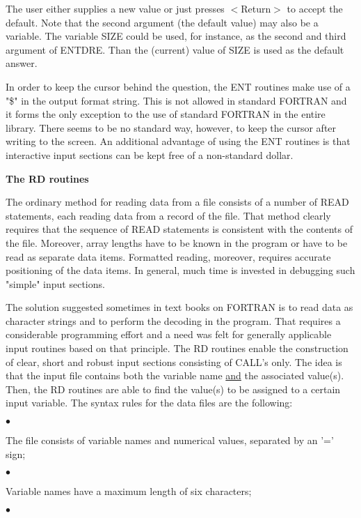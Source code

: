 \documentclass[11pt]{article}
\begin{document}
The user either supplies a new value or just presses $<$Return$>$ to accept the default.
Note that the second argument (the default value) may also be a variable. The variable
SIZE could be used, for instance, as the second and  third argument of ENTDRE. Than
the (current) value of SIZE is used as the default answer.

In order to keep the cursor behind the question, the ENT routines make use of a "\$" in
the output format string. This is not allowed in standard FORTRAN and it forms the only
exception to the use of standard FORTRAN in the entire library. There seems to be no
standard way, however, to keep the cursor after writing to the screen. An additional
advan\-tage of using the ENT routines is that interactive input sections can be kept free of a
non-standard dollar.

\bigskip
\bigskip
{\bf The RD routines}

The ordinary method for reading data from a file consists of a number of READ
statements, each reading data from a record of the file. That method clearly requires that
the sequence of READ statements is consistent with the contents of the file. Moreover,
array lengths have to be known in the program or have to be read as separate data items.
Formatted reading, moreover, requires accurate positioning of the data items. In general,
much time is invested in debugging such "simple" input sections.

The solution suggested sometimes in text books on FORTRAN is to read data as character
strings and to perform the decoding in the program. That requires a considerable
program\-ming effort and a need was felt for generally applicable input routines based on
that principle. The RD routines enable the construction of clear, short and robust input
sections consisting of CALL's only. The idea is that the input file contains both the
variable name \uline{and} the associated value(s). Then, the RD routines are able to find the
value(s) to be assigned to a certain input variable. The syntax rules for the data files are
the following:

$\bullet$
\testlastline

\begin{indenting}{1.27cm}
The file consists of variable names and numerical values, separated by an '='
sign;
\end{indenting}
$\bullet$
\testlastline

\begin{indenting}{1.27cm}
Variable names have a maximum length of six characters;
\end{indenting}
$\bullet$
\testlastline
\end{document}
